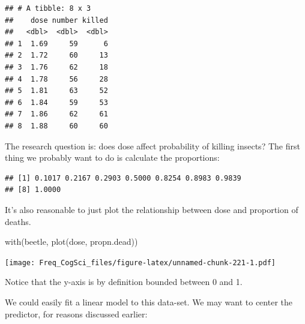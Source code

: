 \documentclass[
  12pt,
]{krantz}
\newenvironment{Shaded}{\begin{snugshade}}{\end{snugshade}}
\newcommand{\AttributeTok}[1]{\textcolor[rgb]{0.77,0.63,0.00}{#1}}
\newcommand{\ConstantTok}[1]{\textcolor[rgb]{0.00,0.00,0.00}{#1}}
\newcommand{\FunctionTok}[1]{\textcolor[rgb]{0.00,0.00,0.00}{#1}}
\newcommand{\NormalTok}[1]{#1}
\newcommand{\OtherTok}[1]{\textcolor[rgb]{0.56,0.35,0.01}{#1}}
\newcommand{\SpecialCharTok}[1]{\textcolor[rgb]{0.00,0.00,0.00}{#1}}
\theoremstyle{definition}
\theoremstyle{definition}
\theoremstyle{definition}
\theoremstyle{definition}
\theoremstyle{remark}
\begin{document}
\begin{verbatim}
## # A tibble: 8 x 3
##    dose number killed
##   <dbl>  <dbl>  <dbl>
## 1  1.69     59      6
## 2  1.72     60     13
## 3  1.76     62     18
## 4  1.78     56     28
## 5  1.81     63     52
## 6  1.84     59     53
## 7  1.86     62     61
## 8  1.88     60     60
\end{verbatim}

The research question is: does dose affect probability of killing insects? The first thing we probably want to do is calculate the proportions:

\begin{Shaded}
\end{Shaded}

\begin{verbatim}
## [1] 0.1017 0.2167 0.2903 0.5000 0.8254 0.8983 0.9839
## [8] 1.0000
\end{verbatim}

It's also reasonable to just plot the relationship between dose and proportion of deaths.

\begin{Shaded}
\begin{Highlighting}[]
\FunctionTok{with}\NormalTok{(beetle, }\FunctionTok{plot}\NormalTok{(dose, propn.dead))}
\end{Highlighting}
\end{Shaded}

\texttt{[image: Freq\_CogSci\_files/figure-latex/unnamed-chunk-221-1.pdf]}

Notice that the y-axis is by definition bounded between 0 and 1.

We could easily fit a linear model to this data-set. We may want to center the predictor, for reasons discussed earlier:

\begin{Shaded}
\end{Shaded}
\end{document}
